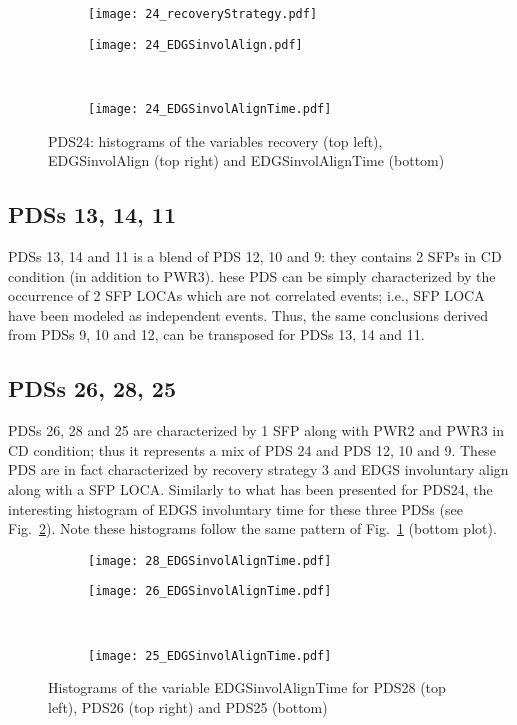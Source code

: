 \begin{figure}
  \begin{subfigure}{.5\linewidth}
    \centering
    \texttt{[image: 24\_recoveryStrategy.pdf]}
  \end{subfigure}%
  \begin{subfigure}{.5\linewidth}
    \centering
    \texttt{[image: 24\_EDGSinvolAlign.pdf]}
  \end{subfigure}\\[1ex]
  \begin{subfigure}{\linewidth}
    \centering
    \texttt{[image: 24\_EDGSinvolAlignTime.pdf]}
  \end{subfigure}
  \caption{PDS24: histograms of the variables recovery (top left), EDGSinvolAlign (top right) and EDGSinvolAlignTime (bottom)}
  \label{fig:histPDS_24}
\end{figure}

\subsection{PDSs 13, 14, 11}
PDSs 13, 14 and 11 is a blend of PDS 12, 10 and 9: they contains 2 SFPs in CD condition (in addition to PWR3). 
hese PDS can be simply characterized
by the occurrence of 2 SFP LOCAs which are not correlated events; i.e., SFP LOCA have been modeled as independent events.
Thus, the same conclusions derived from PDSs 9, 10 and 12, can be transposed for PDSs 13, 14 and 11.

\subsection{PDSs 26, 28, 25}
PDSs 26, 28 and 25 are characterized by 1 SFP along with PWR2 and PWR3 in CD condition; thus it 
represents a mix of PDS 24 and PDS 12, 10 and 9.
These PDS are in fact characterized by recovery strategy 3 and EDGS involuntary align along with a SFP LOCA.
Similarly to what has been presented for PDS24, the interesting histogram of EDGS involuntary time for 
these three PDSs (see Fig.~\ref{fig:histPDS_26_28_25_EDGSinvolAlignTime}). Note these histograms follow the same pattern 
of Fig.~\ref{fig:histPDS_24} (bottom plot).

\begin{figure}
  \begin{subfigure}{.5\linewidth}
    \centering
    \texttt{[image: 28\_EDGSinvolAlignTime.pdf]}
  \end{subfigure}%
  \begin{subfigure}{.5\linewidth}
    \centering
    \texttt{[image: 26\_EDGSinvolAlignTime.pdf]}
  \end{subfigure}\\[1ex]
  \begin{subfigure}{\linewidth}
    \centering
    \texttt{[image: 25\_EDGSinvolAlignTime.pdf]}
  \end{subfigure}
  \caption{Histograms of the variable EDGSinvolAlignTime for PDS28 (top left), PDS26 (top right) and PDS25 (bottom)}
  \label{fig:histPDS_26_28_25_EDGSinvolAlignTime}
\end{figure}

